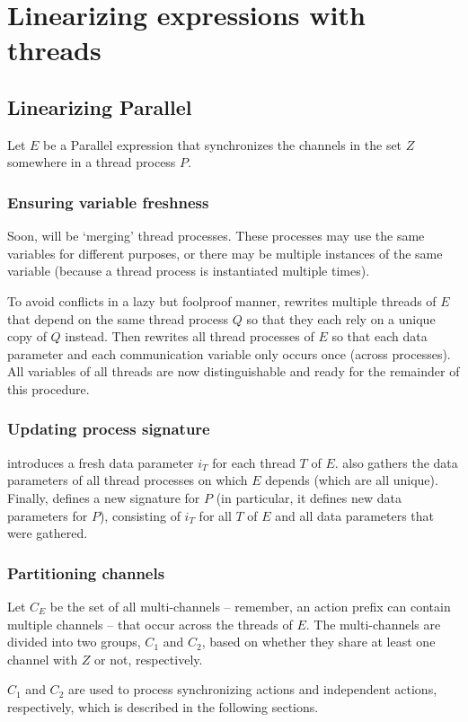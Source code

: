 \chapter{Linearizing expressions with threads} \label{pbranch-flows:chapter}

\section{Linearizing Parallel}

Let $E$ be a Parallel expression that synchronizes the channels in the set $Z$ somewhere in a thread process $P$.

\subsection{Ensuring variable freshness}

Soon, \lpeq{} will be `merging' thread processes.
These processes may use the same variables for different purposes, or there may be multiple instances of the same variable (because a thread process is instantiated multiple times).

To avoid conflicts in a lazy but foolproof manner, \lpeq{} rewrites multiple threads of $E$ that depend on the same thread process $Q$ so that they each rely on a unique copy of $Q$ instead.
Then \lpeq{} rewrites all thread processes of $E$ so that each data parameter and each communication variable only occurs once (across processes).
All variables of all threads are now distinguishable and ready for the remainder of this procedure.

\subsection{Updating process signature}

\lpeq{} introduces a fresh data parameter $i_T$ for each thread $T$ of $E$.
\lpeq{} also gathers the data parameters of all thread processes on which $E$ depends (which are all unique).
Finally, \lpeq{} defines a new signature for $P$ (in particular, it defines new data parameters for $P$), consisting of $i_T$ for all $T$ of $E$ and all data parameters that were gathered.

\begin{samepage}
\subsection{Partitioning channels} \label{channelpartitions:subsection}

Let $C_E$ be the set of all multi-channels -- remember, an action prefix can contain multiple channels -- that occur across the threads of $E$.
The multi-channels are divided into two groups, $C_1$ and $C_2$, based on whether they share at least one channel with $Z$ or not, respectively.

$C_1$ and $C_2$ are used to process synchronizing actions and independent actions, respectively, which is described in the following sections.
\end{samepage}

